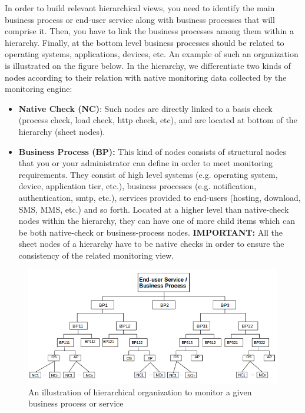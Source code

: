 \documentclass[a4paper,9pt]{article}
\begin{document}
In order to build relevant hierarchical views, you need to identify the main business process or end-user service along with business processes that will comprise it. Then, you have to link the business processes among them within a hierarchy. Finally, at the bottom level business processes should be related to operating systems, applications, devices, etc. An example of such an organization is illustrated on the figure below. 
In the hierarchy, we differentiate two kinds of nodes according to their relation with native monitoring data collected by the monitoring engine:
\begin{itemize}
 \item {\bf Native Check (NC)}: Such nodes are directly linked to a basis check (process check, load check, http check, etc), and are located at bottom of the hierarchy (sheet nodes).
 \item {\bf Business Process (BP):} This kind of nodes consists of structural nodes that you or your administrator can define in order to meet monitoring requirements. They consist of high level systems (e.g. operating system, device, application tier, etc.), business processes (e.g. notification, authentication, smtp, etc.), services provided to end-users (hosting, download, SMS, MMS, etc.) and so forth. Located at a higher level than native-check nodes within the hierarchy, they can have one of more child items which can be both native-check or business-process nodes. {\bf IMPORTANT:} All the sheet nodes of a hierarchy have to be native checks in order to ensure the consistency of the related monitoring view.   
\end{itemize}
\begin{figure}
\centering
\includegraphics[width=12cm]{images/hierarchical-mv.png}
\caption{An illustration of hierarchical organization to monitor a given business process or service}
\end{figure} 
\end{document}
